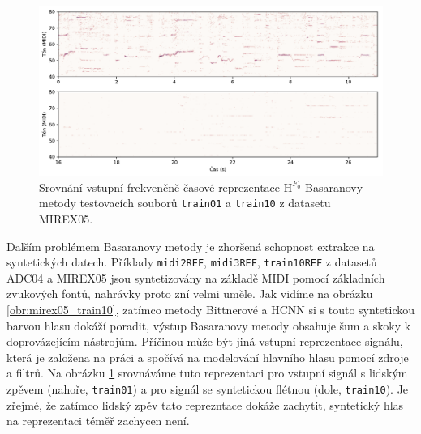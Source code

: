 \begin{figure}[p]\centering
\includegraphics[width=\textwidth,height=\textheight,keepaspectratio]{../img/vysledky/basaran_salience_comparison}
\caption{Srovnání vstupní frekvenčně-časové reprezentace $\bm{\mathrm{H}}^{F_0}$ Basaranovy metody testovacích souborů \texttt{train01} a \texttt{train10} z datasetu MIREX05.}
\label{obr:basaran_salience_comparison}
\end{figure}
Dalším problémem Basaranovy metody je zhoršená schopnost extrakce na syntetických datech. Příklady \texttt{midi2REF}, \texttt{midi3REF}, \texttt{train10REF} z datasetů ADC04 a MIREX05 jsou syntetizovány na základě MIDI pomocí základních zvukových fontů, nahrávky proto zní velmi uměle. Jak vidíme na obrázku \ref{obr:mirex05_train10}, zatímco metody Bittnerové a HCNN si s touto syntetickou barvou hlasu dokáží poradit, výstup Basaranovy metody obsahuje šum a skoky k doprovázejícím nástrojům. Příčinou může být jiná vstupní reprezentace signálu, která je založena na práci \cite{Durrieu2010} a spočívá na modelování hlavního hlasu pomocí zdroje a filtrů. Na obrázku \ref{obr:basaran_salience_comparison} srovnáváme tuto reprezentaci pro vstupní signál s lidským zpěvem (nahoře, \texttt{train01}) a pro signál se syntetickou flétnou (dole, \texttt{train10}). Je zřejmé, že zatímco lidský zpěv tato reprezntace dokáže zachytit, syntetický hlas na reprezentaci téměř zachycen není. 

